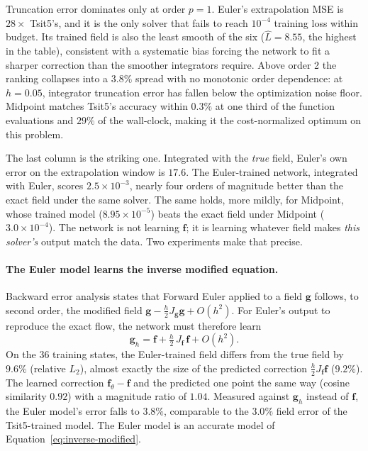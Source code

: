 Truncation error dominates only at order $p=1$. Euler's extrapolation MSE is
$28\times$ Tsit5's, and it is the only solver that fails to reach $10^{-4}$
training loss within budget. Its trained field is also the least smooth of
the six ($\hat L=8.55$, the highest in the table), consistent with a
systematic bias forcing the network to fit a sharper correction than the
smoother integrators require. Above order 2 the ranking collapses into a
$3.8\%$ spread with no monotonic order dependence: at $h=0.05$,
integrator truncation error has fallen below the optimization noise floor.
Midpoint matches Tsit5's accuracy within $0.3\%$ at one third of the
function evaluations and $29\%$ of the wall-clock, making it the
cost-normalized optimum on this problem.

The last column is the striking one. Integrated with the \emph{true} field,
Euler's own error on the extrapolation window is $17.6$. The Euler-trained
network, integrated with Euler, scores $2.5\times10^{-3}$, nearly four orders
of magnitude better than the exact field under the same solver. The same
holds, more mildly, for Midpoint, whose trained model ($8.95\times10^{-5}$)
beats the exact field under Midpoint ($3.0\times10^{-4}$). The network is
not learning $\mathbf{f}$; it is learning whatever field makes
\emph{this solver's} output match the data. Two experiments make that
precise.

\paragraph{The Euler model learns the inverse modified equation.} Backward
error analysis states that Forward Euler applied to a field $\mathbf{g}$
follows, to second order, the modified field
$\mathbf{g}-\tfrac{h}{2}J_{\mathbf{g}}\mathbf{g}+O(h^2)$. For Euler's output
to reproduce the exact flow, the network must therefore learn
\begin{equation}
\mathbf{g}_h=\mathbf{f}+\tfrac{h}{2}\,J_{\mathbf{f}}\,\mathbf{f}+O(h^2).
\label{eq:inverse-modified}
\end{equation}
On the 36 training states, the Euler-trained field differs from the true
field by $9.6\%$ (relative $L_2$), almost exactly the size of the predicted
correction $\tfrac{h}{2}J_{\mathbf{f}}\mathbf{f}$ ($9.2\%$). The learned
correction $\mathbf{f}_\theta-\mathbf{f}$ and the predicted one point the
same way (cosine similarity $0.92$) with a magnitude ratio of $1.04$. Measured
against $\mathbf{g}_h$ instead of $\mathbf{f}$, the Euler model's error falls
to $3.8\%$, comparable to the $3.0\%$ field error of the Tsit5-trained
model. The Euler model is an accurate model of Equation~\ref{eq:inverse-modified}.

